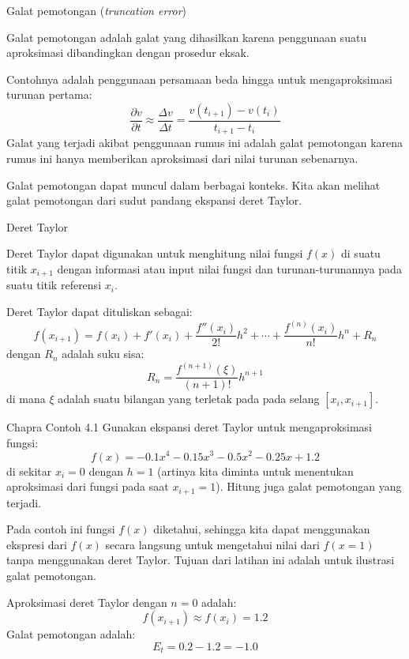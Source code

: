 \begin{frame}{Galat pemotongan (\textit{truncation error})}

Galat pemotongan adalah galat yang dihasilkan karena penggunaan
suatu aproksimasi dibandingkan dengan prosedur eksak.

Contohnya adalah penggunaan persamaan beda hingga untuk mengaproksimasi
turunan pertama:
$$
\frac{\partial v}{\partial t} \approx \frac{\Delta v}{\Delta t}
= \frac{v(t_{i+1}) - v(t_{i})}{t_{i+1} - t_{i}}
$$
Galat yang terjadi akibat penggunaan rumus ini adalah galat pemotongan
karena rumus ini hanya memberikan aproksimasi dari nilai turunan sebenarnya.

Galat pemotongan dapat muncul dalam berbagai konteks. Kita akan melihat galat
pemotongan dari sudut pandang ekspansi deret Taylor.

\end{frame}



\begin{frame}{Deret Taylor}

Deret Taylor dapat digunakan untuk menghitung nilai
fungsi $f(x)$ di suatu titik $x_{i+1}$ dengan informasi atau input
nilai fungsi dan turunan-turunannya pada suatu titik referensi $x_{i}$.

Deret Taylor dapat dituliskan sebagai:
\begin{equation}
f(x_{i+1}) = f(x_i) + f'(x_{i}) + \frac{f''(x_i)}{2!}h^2 + \cdots +
\frac{f^{(n)}(x_i)}{n!}h^n + R_{n}
\end{equation}
dengan $R_{n}$ adalah suku sisa:
\begin{equation}
R_{n} = \frac{f^{(n+1)}(\xi)}{(n+1)!}h^{n+1}
\end{equation}
di mana $\xi$ adalah suatu bilangan yang terletak pada pada selang
$[x_i, x_{i+1}]$.

\end{frame}


\begin{frame}

\fontsize{9}{10}\selectfont

\begin{block}{Chapra Contoh 4.1}
Gunakan ekspansi deret Taylor untuk mengaproksimasi fungsi:
$$
f(x) = -0.1 x^{4} - 0.15 x^{3} - 0.5 x^{2} - 0.25 x + 1.2
$$
di sekitar $x_{i} = 0$ dengan $h=1$ (artinya kita diminta untuk menentukan
aproksimasi dari fungsi pada saat $x_{i+1}=1$). Hitung juga galat pemotongan
yang terjadi.
\end{block}

Pada contoh ini fungsi $f(x)$ diketahui, sehingga kita dapat menggunakan
ekspresi dari $f(x)$ secara langsung untuk mengetahui nilai dari $f(x=1)$
tanpa menggunakan deret Taylor.
Tujuan dari latihan ini adalah untuk ilustrasi galat pemotongan.

Aproksimasi deret Taylor dengan $n=0$ adalah:
$$
f(x_{i+1}) \approx f(x_{i}) = 1.2
$$
Galat pemotongan adalah:
$$
E_{t} = 0.2 - 1.2 = -1.0
$$

\end{frame}



